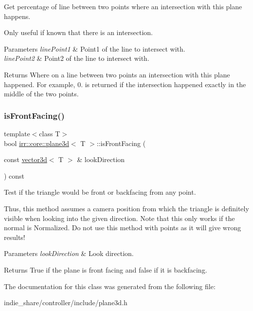 Get percentage of line between two points where an intersection with this plane happens. 

Only useful if known that there is an intersection. 
\begin{DoxyParams}{Parameters}
{\em line\+Point1} & Point1 of the line to intersect with. \\
\hline
{\em line\+Point2} & Point2 of the line to intersect with. \\
\hline
\end{DoxyParams}
\begin{DoxyReturn}{Returns}
Where on a line between two points an intersection with this plane happened. For example, 0. is returned if the intersection happened exactly in the middle of the two points. 
\end{DoxyReturn}
\mbox{\label{classirr_1_1core_1_1plane3d_aca0237b25cbf4fe13d87b14a04d68df9}} 
\subsubsection{\texorpdfstring{is\+Front\+Facing()}{isFrontFacing()}}
{\footnotesize\ttfamily template$<$class T$>$ \\
bool \hyperlink{classirr_1_1core_1_1plane3d}{irr\+::core\+::plane3d}$<$ T $>$\+::is\+Front\+Facing (\begin{DoxyParamCaption}\item[{const \hyperlink{classirr_1_1core_1_1vector3d}{vector3d}$<$ T $>$ \&}]{look\+Direction }\end{DoxyParamCaption}) const\hspace{0.3cm}{\ttfamily [inline]}}



Test if the triangle would be front or backfacing from any point. 

Thus, this method assumes a camera position from which the triangle is definitely visible when looking into the given direction. Note that this only works if the normal is Normalized. Do not use this method with points as it will give wrong results! 
\begin{DoxyParams}{Parameters}
{\em look\+Direction} & Look direction. \\
\hline
\end{DoxyParams}
\begin{DoxyReturn}{Returns}
True if the plane is front facing and false if it is backfacing. 
\end{DoxyReturn}


The documentation for this class was generated from the following file\+:\begin{DoxyCompactItemize}
\item 
indie\+\_\+share/controller/include/plane3d.\+h\end{DoxyCompactItemize}
